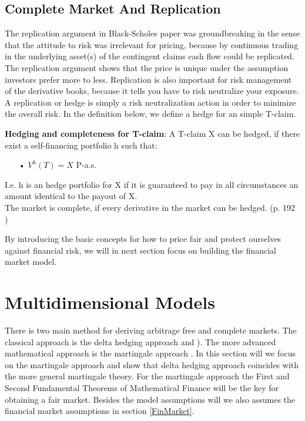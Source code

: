 \subsection{Complete Market And Replication}
The replication argument in Black-Scholes paper \parencite{B-S-Paper} was groundbreaking in the sense that the attitude to risk was irrelevant for pricing, because by continuous trading in the underlying asset(s) of the contingent claims cash flow could be replicated. The replication argument shows that the price is unique under the assumption investors prefer more to less. Replication is also important for risk management of the derivative books, because it tells you have to risk neutralize your exposure. A replication or hedge is simply a risk neutralization action in order to minimize the overall risk. In the definition below, we define a hedge for an simple T-claim.
\theoremstyle{definition}
\begin{definition}{\textbf{Hedging and completeness for T-claim}:}
A T-claim X can be hedged, if there exist a self-financing portfolio h such that:
\begin{enumerate}
\item[•] $V^{h}(T)=X$ P-a.s.
\end{enumerate}
I.e. h is an hedge portfolio for X if it is guaranteed to pay in all circumstances an amount identical to the payout of X.\\
The market is complete, if every derivative in the market can be hedged.
(p. 192 \parencite{finKont})
\end{definition}

By introducing the basic concepts for how to price fair and protect ourselves against financial risk, we will in next section focus on building the financial market model.


\section{Multidimensional Models}\label{MultiDimModel}
There is two main method for deriving arbitrage free and complete markets. The classical approach is the delta hedging approach \parencite{B-S-Paper} and \parencite{CRR}). The more advanced mathematical approach is the martingale approach  \parencite{finKont}. In this section will we focus on the martingale approach and show that delta hedging approach coincides with the more general martingale theory. For the martingale approach the First and Second Fundamental Theorems of Mathematical Finance will be the key for obtaining a fair market. Besides the model assumptions will we also assumes the financial market assumptions in section \ref{FinMarket}.

